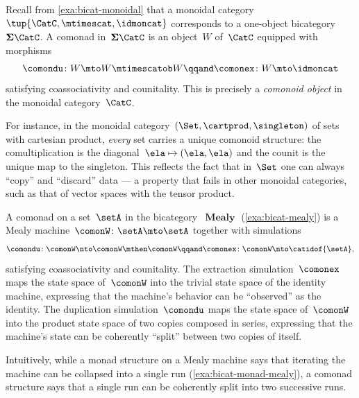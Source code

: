 \begin{example}
    \label{exa:bicat-comonad-monoidal}
    Recall from \cref{exa:bicat-monoidal} that a monoidal category~$\tup{\CatC, \mtimescat, \idmoncat}$ corresponds to a one-object bicategory~$\mathbf{\Sigma}\CatC$.
    A comonad in~$\mathbf{\Sigma}\CatC$ is an object~$W$ of~$\CatC$ equipped with morphisms
    \begin{equation}
        \comondu \colon W \mto W \mtimescatob W \qqand \comonex \colon W \mto \idmoncat
    \end{equation}
    satisfying coassociativity and counitality.
    This is precisely a \emph{comonoid object} in the monoidal category~$\CatC$.

    For instance, in the monoidal category~$(\Set, \cartprod, \singleton)$ of sets with cartesian product, \emph{every} set carries a unique comonoid structure: the comultiplication is the diagonal~$\ela \mapsto (\ela, \ela)$ and the counit is the unique map to the singleton.
    This reflects the fact that in~$\Set$ one can always ``copy'' and ``discard'' data --- a property that fails in other monoidal categories, such as that of vector spaces with the tensor product.
\end{example}

\begin{example}
    \label{exa:bicat-comonad-mealy}
    A comonad on a set~$\setA$ in the bicategory~$\operatorname{\textbf{Mealy}}$ (\cref{exa:bicat-mealy}) is a Mealy machine~$\comonW \colon \setA \mto \setA$ together with simulations
    \begin{equation}
        \comondu \colon \comonW \nto \comonW \mthen \comonW \qqand \comonex \colon \comonW \nto \catidof{\setA},
    \end{equation}
    satisfying coassociativity and counitality.
    The extraction simulation~$\comonex$ maps the state space of~$\comonW$ into the trivial state space of the identity machine, expressing that the machine's behavior can be ``observed'' as the identity.
    The duplication simulation~$\comondu$ maps the state space of~$\comonW$ into the product state space of two copies composed in series, expressing that the machine's state can be coherently ``split'' between two copies of itself.

    Intuitively, while a monad structure on a Mealy machine says that iterating the machine can be collapsed into a single run (\cref{exa:bicat-monad-mealy}), a comonad structure says that a single run can be coherently split into two successive runs.
\end{example}




